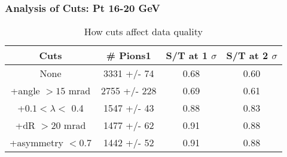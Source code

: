 \frame
{
\frametitle{Analysis of Cuts: Pt 16-20 GeV}
\begin{table}
\caption{How cuts affect data quality}
\centering
\begin{tabular}{c c c c}
\hline\hline
Cuts & \# Pions1 & S/T at 1 $\sigma$ & S/T at 2 $\sigma$ \\ [0.5ex]
\hline
None & 3331 +/-   74 & 0.68 & 0.60 \\ %
+angle $> 15$ mrad & 2755 +/-  228 & 0.69 & 0.61 \\ %
+$0.1 < \lambda <$ 0.4 & 1547 +/-   43 & 0.88 & 0.83 \\ %
+dR $> 20$ mrad & 1477 +/-   62 & 0.91 & 0.88 \\ %
+asymmetry $< 0.7$ & 1442 +/-   52 & 0.91 & 0.88 \\ %
[1ex]
\hline
\end{tabular}
\label{table:nonlin}
\end{table}
}
